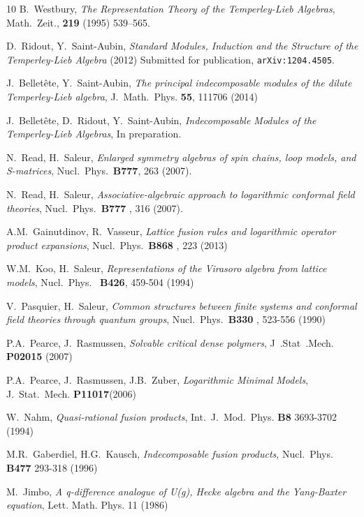 \documentclass[reqno]{amsart}
\begin{document}
\begin{thebibliography}{10}
	 B.~Westbury, {\em The Representation Theory of the Temperley-Lieb Algebras}, Math.~Zeit., {\bf 219} (1995) 539--565.
  
	 D.~Ridout, Y.~Saint-Aubin, {\em Standard Modules, Induction and the Structure of the Temperley-Lieb Algebra} (2012) Submitted for publication, {\tt arXiv:1204.4505}.
	
	 J.~Bellet\^{e}te, Y.~Saint-Aubin, \emph{The principal indecomposable modules of the dilute
                 Temperley-Lieb algebra}, J.~Math.~Phys. {\bf 55}, 111706 (2014)
    
     J.~Bellet\^{e}te, D.~Ridout, Y.~Saint-Aubin, \emph{Indecomposable Modules of the Temperley-Lieb Algebras}, In preparation.
    
     N.~Read, H.~Saleur, \emph{Enlarged symmetry algebras of spin chains, loop models, and S-matrices}, Nucl.~Phys.~{\bf B777}, 263 (2007).
    
     N.~Read, H.~Saleur, \emph{Associative-algebraic approach to logarithmic conformal field theories}, Nucl.~Phys.~{\bf B777 }, 316 (2007).
    
      A.M.~Gainutdinov, R.~Vasseur, \emph{Lattice fusion rules and logarithmic operator product expansions}, Nucl.~Phys.~{\bf B868 }, 223 (2013)
    
     W.M.~Koo, H.~Saleur, \emph{Representations of the Virasoro algebra from lattice models}, Nucl.~Phys.~ {\bf B426}, 459-504 (1994)
    
     V.~Pasquier, H.~Saleur, \emph{Common structures between finite systems and conformal field theories through quantum groups}, Nucl.~Phys.~{\bf B330 }, 523-556  (1990)
    
     P.A.~Pearce, J.~Rasmussen, \emph{Solvable critical dense polymers}, J~.Stat~.Mech.  {\bf P02015} (2007)
    
     P.A.~Pearce, J.~Rasmussen, J.B.~Zuber, \emph{Logarithmic Minimal Models}, J.~Stat.~Mech.  {\bf P11017}(2006) 
    
     W.~Nahm, \emph{Quasi-rational fusion products}, Int.~J.~Mod.~Phys. {\bf{B8}}  3693-3702 (1994) 
    
     M.R.~Gaberdiel, H.G.~Kausch, \emph{Indecomposable fusion products}, Nucl.~Phys. {\bf{B477}} 293-318 (1996)  
    
     M.~Jimbo, \emph{A q-difference analogue of U(g), Hecke algebra and the Yang-Baxter equation}, Lett. Math. Phys. 11 (1986)
    

\end{thebibliography}
\end{document}
